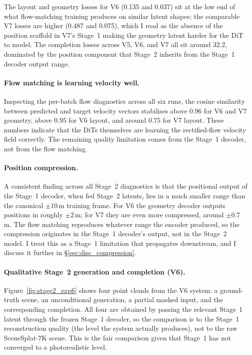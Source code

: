 The layout and geometry losses for V6 (0.135 and 0.037) sit at the low end of what flow-matching training produces on similar latent shapes; the comparable V7 losses are higher (0.487 and 0.075), which I read as the absence of the position scaffold in V7's Stage~1 making the geometry latent harder for the DiT to model. The completion losses across V5, V6, and V7 all sit around $32.2$, dominated by the position component that Stage~2 inherits from the Stage~1 decoder output range.

\paragraph{Flow matching is learning velocity well.} Inspecting the per-batch flow diagnostics across all six runs, the cosine similarity between predicted and target velocity vectors stabilises above $0.96$ for V6 and V7 geometry, above $0.95$ for V6 layout, and around $0.75$ for V7 layout. These numbers indicate that the DiTs themselves are learning the rectified-flow velocity field correctly. The remaining quality limitation comes from the Stage~1 decoder, not from the flow matching.

\paragraph{Position compression.} A consistent finding across all Stage~2 diagnostics is that the positional output of the Stage~1 decoder, when fed Stage~2 latents, lies in a much smaller range than the canonical $\pm 10$\,m training frame. For V6 the geometry decoder outputs positions in roughly $\pm 2$\,m; for V7 they are even more compressed, around $\pm 0.7$\,m. The flow matching reproduces whatever range the encoder produced, so the compression originates in the Stage~1 decoder's output, not in the Stage~2 model. I treat this as a Stage~1 limitation that propagates downstream, and I discuss it further in \S\ref{sec:disc_compression}.

\paragraph{Qualitative Stage~2 generation and completion (V6).} Figure~\ref{fig:stage2_exp6} shows four point clouds from the V6 system: a ground-truth scene, an unconditional generation, a partial masked input, and the corresponding completion. All four are obtained by passing the relevant Stage~1 latent through the frozen Stage~1 decoder, so the comparison is to the Stage~1 reconstruction quality (the level the system actually produces), not to the raw SceneSplat-7K scene. This is the fair comparison given that Stage~1 has not converged to a photorealistic level.

